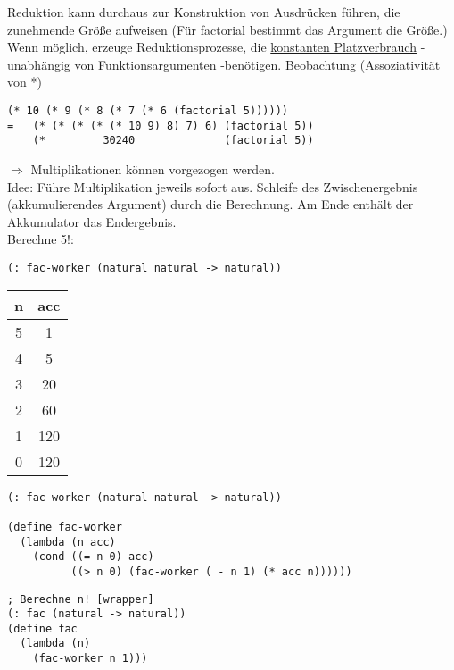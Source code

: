 \documentclass[a4paper,12pt]{article}
\begin{document}
Reduktion kann durchaus zur Konstruktion von Ausdrücken führen, die zunehmende Größe aufweisen (Für factorial bestimmt das Argument die Größe.)
Wenn möglich, erzeuge Reduktionsprozesse, die \uline{konstanten Platzverbrauch} - unabhängig von Funktionsargumenten -benötigen.
Beobachtung (Assoziativität von *)
\begin{lstlisting}[style=customc]
    (* 10 (* 9 (* 8 (* 7 (* 6 (factorial 5))))))
=   (* (* (* (* (* 10 9) 8) 7) 6) (factorial 5))
    (*         30240              (factorial 5))
\end{lstlisting}
$\Rightarrow$ Multiplikationen können vorgezogen werden.\\

Idee: Führe Multiplikation jeweils sofort aus.
Schleife des Zwischenergebnis (akkumulierendes Argument) durch die Berechnung. Am Ende enthält der Akkumulator das Endergebnis.\\
Berechne 5!:\\
\begin{lstlisting}[style=customc]
(: fac-worker (natural natural -> natural))
\end{lstlisting}
\begin{center}
\begin{tabular}{c|c}
n & acc \\
\hline
5 & 1   \\
4 & 5   \\
3 & 20  \\
2 & 60  \\
1 & 120 \\
0 & 120 \\
\end{tabular}
\end{center}
\begin{lstlisting}[style=customc]
(: fac-worker (natural natural -> natural))

(define fac-worker
  (lambda (n acc)
    (cond ((= n 0) acc)
		  ((> n 0) (fac-worker ( - n 1) (* acc n))))))
\end{lstlisting}
\begin{lstlisting}[style=customc]
; Berechne n! [wrapper]
(: fac (natural -> natural))
(define fac
  (lambda (n)
    (fac-worker n 1)))
    		  
\end{lstlisting}
\end{document}
